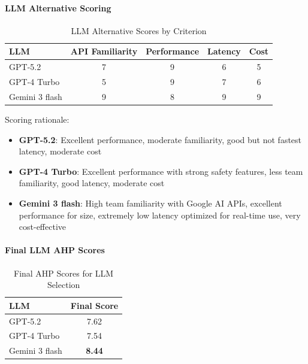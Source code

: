 \paragraph{LLM Alternative Scoring}
\begin{table}[H]
\centering
\caption{LLM Alternative Scores by Criterion}
\begin{tabular}{lcccc}
\toprule
\textbf{LLM} & \textbf{API Familiarity} & \textbf{Performance} & \textbf{Latency} & \textbf{Cost} \\
\midrule
GPT-5.2 & 7 & 9 & 6 & 5 \\
GPT-4 Turbo & 5 & 9 & 7 & 6 \\
Gemini 3 flash & 9 & 8 & 9 & 9 \\
\bottomrule
\end{tabular}
\end{table}

Scoring rationale:
\begin{itemize}
    \item \textbf{GPT-5.2}: Excellent performance, moderate familiarity, good but not fastest latency, moderate cost
    \item \textbf{GPT-4 Turbo}: Excellent performance with strong safety features, less team familiarity, good latency, moderate cost
    \item \textbf{Gemini 3 flash}: High team familiarity with Google AI APIs, excellent performance for size, extremely low latency optimized for real-time use, very cost-effective
\end{itemize}

\paragraph{Final LLM AHP Scores}
\begin{table}[H]
\centering
\caption{Final AHP Scores for LLM Selection}
\begin{tabular}{lc}
	{LLM} & \textbf{Final Score} \\
\midrule
GPT-5.2 & 7.62 \\
GPT-4 Turbo & 7.54 \\
Gemini 3 flash & \textbf{8.44} \\
\bottomrule
\end{tabular}
\end{table}

